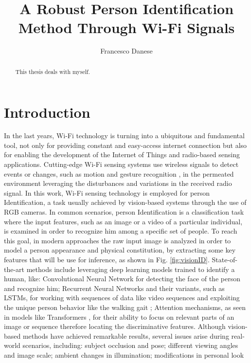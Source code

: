 \documentclass[binding=0.7cm, oneside]{sapthesis}
\title{A Robust Person Identification Method Through Wi-Fi Signals}
\author{Francesco Danese}
\begin{document}
\frontmatter
\maketitle

\begin{abstract}
    This thesis deals with myself.
\end{abstract}

\tableofcontents
\mainmatter
\chapter{Introduction}
In the last years, Wi-Fi technology is turning into a ubiquitous and fundamental tool, not only for providing
constant and easy-access internet connection but also for enabling the development of the Internet of Things and
radio-based sensing applications. Cutting-edge Wi-Fi sensing systems use wireless signals to detect events or changes,
such as motion and gesture recognition \cite{gesture_recognition}, in the permeated environment leveraging the disturbances
and variations in the received radio signal. In this work, Wi-Fi sensing technology is employed for person Identification, a task
usually achieved by vision-based systems through the use of RGB cameras. In common scenarios, person Identification is a classification
task where the input features, such as an image or a video of a particular individual, is examined in order to recognize him among a specific
set of people. To reach this goal, in modern approaches the raw input image is analyzed in order to model a person appearance and physical
constitution, by extracting some key features that will be use for inference, as shown in Fig. \ref{fig:visionID}. State-of-the-art methods include leveraging deep learning models
trained to identify a human, like: Convolutional Neural Network for detecting the face of the person \cite{cnn_face_id} and recognize him;
Recurrent Neural Networks \cite{Recurrent_nn_reid} and their variants, such as LSTMs, for working with sequences of data like video sequences
and exploiting the unique person behavior like the walking gait \cite{Gait_cnn}; Attention mechanisms, as seen in models like Transformers \cite{Transformers_reid},
for their ability to focus on relevant parts of an image or sequence therefore locating the discriminative features.
Although vision-based methods have achieved remarkable results, several issues arise during real-world scenarios, including:
subject occlusion and pose; different viewing angles and image scale; ambient changes in illumination; modifications in personal look
\end{document}
